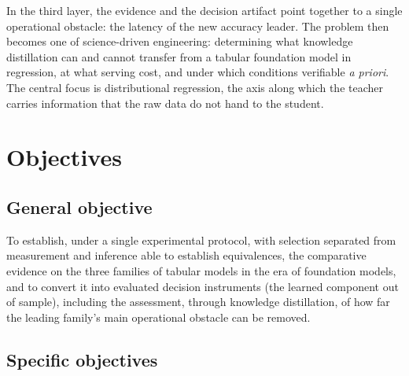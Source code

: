 In the third layer, the evidence and the decision artifact point
together to a single operational obstacle: the latency of the new
accuracy leader. The problem then becomes one of science-driven
engineering: determining what knowledge distillation can and cannot
transfer from a tabular foundation model in regression, at what
serving cost, and under which conditions verifiable \emph{a priori}.
The central focus is distributional regression, the axis along which
the teacher carries information that the raw data do not hand to the
student.

\section{Objectives}
\label{sec:intro-objetivos}

\subsection{General objective}

To establish, under a single experimental protocol, with selection
separated from measurement and inference able to establish equivalences,
the comparative evidence on the three families of tabular models in
the era of foundation models, and to convert it into evaluated
decision instruments (the learned component out of sample), including
the assessment, through knowledge distillation, of how far the
leading family's main operational obstacle can be removed.

\subsection{Specific objectives}

